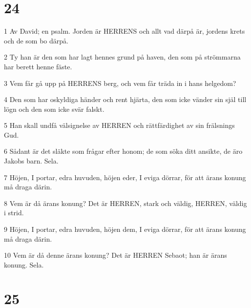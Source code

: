 \chapter{24}

\par 1 Av David; en psalm. Jorden är HERRENS och allt vad därpå är, jordens krets och de som bo därpå.
\par 2 Ty han är den som har lagt hennes grund på haven, den som på strömmarna har berett henne fäste.
\par 3 Vem får gå upp på HERRENS berg, och vem får träda in i hans helgedom?
\par 4 Den som har oskyldiga händer och rent hjärta, den som icke vänder sin själ till lögn och den som icke svär falskt.
\par 5 Han skall undfå välsignelse av HERREN och rättfärdighet av sin frälsnings Gud.
\par 6 Sådant är det släkte som frågar efter honom; de som söka ditt ansikte, de äro Jakobs barn. Sela.
\par 7 Höjen, I portar, edra huvuden, höjen eder, I eviga dörrar, för att ärans konung må draga därin.
\par 8 Vem är då ärans konung? Det är HERREN, stark och väldig, HERREN, väldig i strid.
\par 9 Höjen, I portar, edra huvuden, höjen dem, I eviga dörrar, för att ärans konung må draga därin.
\par 10 Vem är då denne ärans konung? Det är HERREN Sebaot; han är ärans konung. Sela.

\chapter{25}


